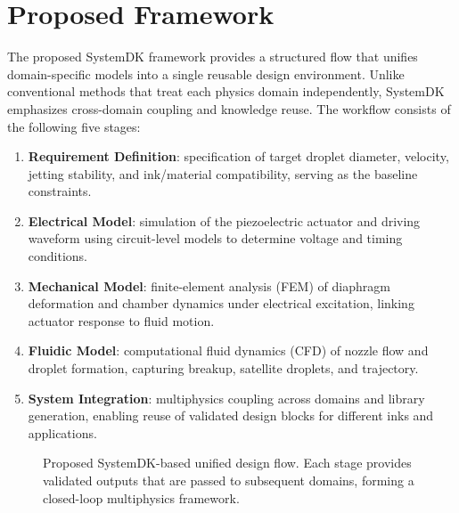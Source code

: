 \documentclass[conference]{IEEEtran}
\begin{document}
\section{Proposed Framework}
The proposed SystemDK framework provides a structured flow that unifies domain-specific models into a single reusable design environment. 
Unlike conventional methods that treat each physics domain independently, SystemDK emphasizes cross-domain coupling and knowledge reuse. 
The workflow consists of the following five stages:

\begin{enumerate}
  \item \textbf{Requirement Definition}: specification of target droplet diameter, velocity, jetting stability, and ink/material compatibility, serving as the baseline constraints.
  \item \textbf{Electrical Model}: simulation of the piezoelectric actuator and driving waveform using circuit-level models to determine voltage and timing conditions.
  \item \textbf{Mechanical Model}: finite-element analysis (FEM) of diaphragm deformation and chamber dynamics under electrical excitation, linking actuator response to fluid motion.
  \item \textbf{Fluidic Model}: computational fluid dynamics (CFD) of nozzle flow and droplet formation, capturing breakup, satellite droplets, and trajectory.
  \item \textbf{System Integration}: multiphysics coupling across domains and library generation, enabling reuse of validated design blocks for different inks and applications.
\end{enumerate}

\begin{figure}[t]
\centering
{}
\caption{Proposed SystemDK-based unified design flow. 
Each stage provides validated outputs that are passed to subsequent domains, forming a closed-loop multiphysics framework.}
\label{fig:flow}
\end{figure}
\end{document}
